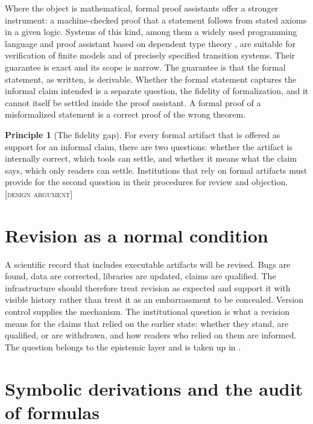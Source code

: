 \documentclass[11pt,twoside,openright]{book}
\theoremstyle{plain}
\theoremstyle{definition}
\newtheorem{principle}[theorem]{Principle}
\theoremstyle{remark}
\newcommand{\Design}{\textup{\textsc{[design argument]}}}
\begin{document}
Where the object is mathematical, formal proof assistants offer a stronger instrument: a machine-checked proof that a statement follows from stated axioms in a given logic. Systems of this kind, among them a widely used programming language and proof assistant based on dependent type theory \cite{demoura2021}, are suitable for verification of finite models and of precisely specified transition systems. Their guarantee is exact and its scope is narrow. The guarantee is that the formal statement, as written, is derivable. Whether the formal statement captures the informal claim intended is a separate question, the fidelity of formalization, and it cannot itself be settled inside the proof assistant. A formal proof of a misformalized statement is a correct proof of the wrong theorem.

\begin{principle}[The fidelity gap]\label{pr:fidelity}
For every formal artifact that is offered as support for an informal claim, there are two questions: whether the artifact is internally correct, which tools can settle, and whether it means what the claim says, which only readers can settle. Institutions that rely on formal artifacts must provide for the second question in their procedures for review and objection.
\Design{}
\end{principle}

\section{Revision as a normal condition}

A scientific record that includes executable artifacts will be revised. Bugs are found, data are corrected, libraries are updated, claims are qualified. The infrastructure should therefore treat revision as expected and support it with visible history rather than treat it as an embarrassment to be concealed. Version control supplies the mechanism. The institutional question is what a revision means for the claims that relied on the earlier state: whether they stand, are qualified, or are withdrawn, and how readers who relied on them are informed. The question belongs to the epistemic layer and is taken up in .

\section{Symbolic derivations and the audit of formulas}\label{sec:symbolic}
\end{document}
